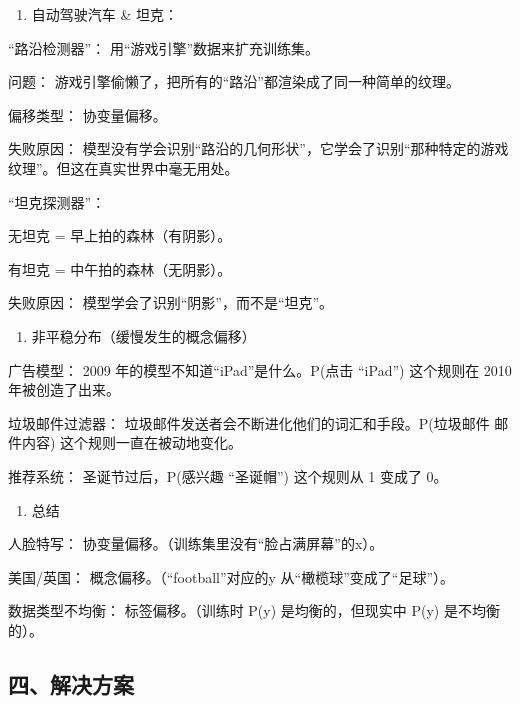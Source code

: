 \begin{enumerate}
\def\labelenumi{\arabic{enumi}.}
\setcounter{enumi}{1}
\tightlist
\item
  自动驾驶汽车 \& 坦克：
\end{enumerate}

``路沿检测器''： 用``游戏引擎''数据来扩充训练集。

问题： 游戏引擎偷懒了，把所有的``路沿''都渲染成了同一种简单的纹理。

偏移类型： 协变量偏移。

失败原因： 模型没有学会识别``路沿的几何形状''，它学会了识别``那种特定的游戏纹理''。但这在真实世界中毫无用处。

``坦克探测器''：

无坦克 = 早上拍的森林（有阴影）。

有坦克 = 中午拍的森林（无阴影）。

失败原因： 模型学会了识别``阴影''，而不是``坦克''。

\begin{enumerate}
\def\labelenumi{\arabic{enumi}.}
\setcounter{enumi}{2}
\tightlist
\item
  非平稳分布（缓慢发生的概念偏移）
\end{enumerate}

广告模型： 2009 年的模型不知道``iPad''是什么。P(点击 \textbar{} ``iPad'') 这个规则在 2010 年被创造了出来。

垃圾邮件过滤器： 垃圾邮件发送者会不断进化他们的词汇和手段。P(垃圾邮件 \textbar{} 邮件内容) 这个规则一直在被动地变化。

推荐系统： 圣诞节过后，P(感兴趣 \textbar{} ``圣诞帽'') 这个规则从 1 变成了 0。

\begin{enumerate}
\def\labelenumi{\arabic{enumi}.}
\setcounter{enumi}{3}
\tightlist
\item
  总结
\end{enumerate}

人脸特写： 协变量偏移。（训练集里没有``脸占满屏幕''的x）。

美国/英国： 概念偏移。（``football''对应的y 从``橄榄球''变成了``足球''）。

数据类型不均衡： 标签偏移。（训练时 P(y) 是均衡的，但现实中 P(y) 是不均衡的）。

\hypertarget{ux56dbux89e3ux51b3ux65b9ux6848}{%
\subsection{四、解决方案}\label{ux56dbux89e3ux51b3ux65b9ux6848}}

